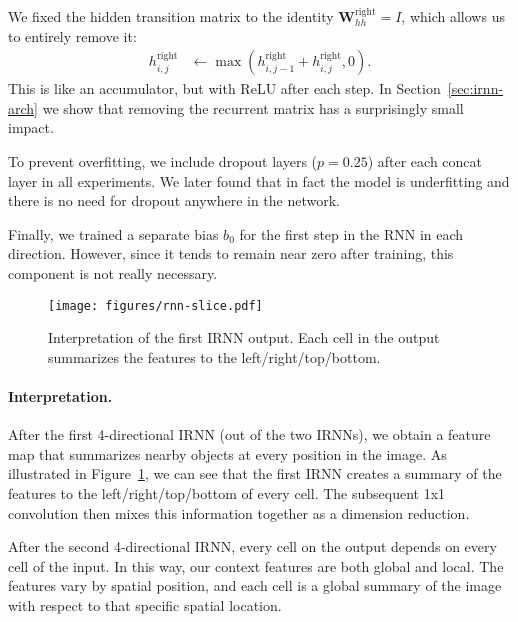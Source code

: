 \documentclass[10pt,twocolumn,letterpaper]{article}
\begin{document}
\begin{packed_enum}
\item We fixed the hidden transition matrix to the identity $\mathbf{W}_{hh}^\text{right}
= I$, which allows us to entirely remove it:
\begin{align}
  h_{i,j}^\text{right} &\gets \max\left( h_{i,j-1}^\text{right} + h_{i,j}^\text{right}, 0 \right).
  \label{eq:no-whh}
\end{align}
This is like an accumulator, but with ReLU after each step.  In
Section~\ref{sec:irnn-arch} we show that removing the recurrent matrix has a
surprisingly small impact.
\item To prevent overfitting, we include dropout layers ($p = 0.25$)
after each concat layer in all experiments.  We later found that in fact the model is
underfitting and there is no need for dropout anywhere in the network.
\item Finally, we trained a separate bias $b_0$ for the first step in the RNN
in each direction. However, since it tends to remain near zero after training,
this component is not really necessary.
\end{packed_enum}\begin{figure}[t]
  \begin{center}
   \texttt{[image: figures/rnn-slice.pdf]}
  \end{center}
  \vspace{-6pt}
  \caption{Interpretation of the first IRNN output.  Each cell in the output
  summarizes the features to the left/right/top/bottom.}
  \label{fig:rnn-slice}
  \vspace{-6pt}
\end{figure}\paragraph{Interpretation.}
After the first 4-directional IRNN (out of the two IRNNs), we obtain a feature map that summarizes
nearby objects at every position in the image.  As illustrated in
Figure~\ref{fig:rnn-slice}, we can see that the first IRNN creates a summary of
the features to the left/right/top/bottom of every cell.  The subsequent 1x1
convolution then mixes this information together as a dimension reduction.

After the second 4-directional IRNN, every cell on the output depends on every
cell of the input.  In this way, our context features are both global and
local.  The features vary by spatial position, and each cell is a global
summary of the image with respect to that specific spatial location.
\end{document}
